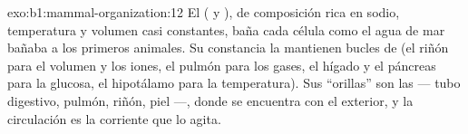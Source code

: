 \begin{solution}{exo:b1:mammal-organization:12}
El  ( y ), de composición rica
en sodio, temperatura y volumen casi constantes, baña cada célula como el
agua de mar bañaba a los primeros animales. Su constancia la mantienen
bucles de  (el riñón para el volumen y los iones,
el pulmón para los gases, el hígado y el páncreas para la glucosa, el
hipotálamo para la temperatura). Sus ``orillas'' son las  --- tubo digestivo, pulmón, riñón, piel ---, donde se encuentra
con el exterior, y la circulación es la corriente que lo agita.
\end{solution}

